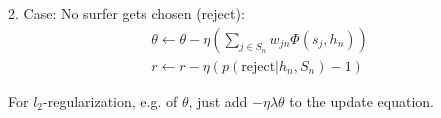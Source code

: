 2. Case: No surfer gets chosen (reject):
\begin{eqnarray}
\theta \leftarrow \theta - \eta (\sum_{j \in S_n} w_{jn} \Phi(s_j,h_n))\\
r \leftarrow r - \eta (p(\text{reject} | h_n, S_n)-1)
\end{eqnarray}

For $l_2$-regularization, e.g. of $\theta$, just add $- \eta \lambda \theta$ to the update equation.